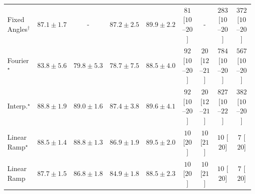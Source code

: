 \begin{tabular}{l|cccc|cccc|}
Fixed Angles$^\dagger$ & {\cellcolor[HTML]{034E7B}} \color[HTML]{F1F1F1} $87.1\pm 1.7$ & {\cellcolor[HTML]{000000}} \color[HTML]{F1F1F1} {\cellcolor{white}} \color{black} - & {\cellcolor[HTML]{034E7B}} \color[HTML]{F1F1F1} $87.2\pm 2.5$ & {\cellcolor[HTML]{034165}} \color[HTML]{F1F1F1} $89.9\pm 2.2$ & {\cellcolor[HTML]{FEE6E3}} \color[HTML]{000000} $81$ [$10$--$20$] & {\cellcolor[HTML]{000000}} \color[HTML]{F1F1F1} {\cellcolor{white}} \color{black} - & {\cellcolor[HTML]{FBAAB8}} \color[HTML]{000000} $283$ [$10$--$20$] & {\cellcolor[HTML]{F881AA}} \color[HTML]{F1F1F1} $372$ [$10$--$20$] \\
Fourier$^\star$ & {\cellcolor[HTML]{045E93}} \color[HTML]{F1F1F1} $83.8\pm 5.6$ & {\cellcolor[HTML]{056BA9}} \color[HTML]{F1F1F1} $79.8\pm 5.3$ & {\cellcolor[HTML]{056FAE}} \color[HTML]{F1F1F1} $78.7\pm 7.5$ & {\cellcolor[HTML]{034871}} \color[HTML]{F1F1F1} $88.5\pm 4.0$ & {\cellcolor[HTML]{FDE4E1}} \color[HTML]{000000} $92$ [$10$--$20$] & {\cellcolor[HTML]{FFF4F0}} \color[HTML]{000000} $20$ [$12$--$21$] & {\cellcolor[HTML]{5D006F}} \color[HTML]{F1F1F1} $784$ [$10$--$20$] & {\cellcolor[HTML]{C71D8C}} \color[HTML]{F1F1F1} $567$ [$10$--$20$] \\
Interp.$^\star$ & {\cellcolor[HTML]{03466E}} \color[HTML]{F1F1F1} $88.8\pm 1.9$ & {\cellcolor[HTML]{03456C}} \color[HTML]{F1F1F1} $89.0\pm 1.6$ & {\cellcolor[HTML]{034D79}} \color[HTML]{F1F1F1} $87.4\pm 3.8$ & {\cellcolor[HTML]{034267}} \color[HTML]{F1F1F1} $89.6\pm 4.1$ & {\cellcolor[HTML]{FDE4E1}} \color[HTML]{000000} $92$ [$10$--$20$] & {\cellcolor[HTML]{FFF4F0}} \color[HTML]{000000} $20$ [$12$--$21$] & {\cellcolor[HTML]{49006A}} \color[HTML]{F1F1F1} $827$ [$10$--$22$] & {\cellcolor[HTML]{F87AA8}} \color[HTML]{F1F1F1} $382$ [$10$--$20$] \\
Linear Ramp$^\star$ & {\cellcolor[HTML]{034871}} \color[HTML]{F1F1F1} $88.5\pm 1.4$ & {\cellcolor[HTML]{03466E}} \color[HTML]{F1F1F1} $88.8\pm 1.3$ & {\cellcolor[HTML]{034F7D}} \color[HTML]{F1F1F1} $86.9\pm 1.9$ & {\cellcolor[HTML]{034369}} \color[HTML]{F1F1F1} $89.5\pm 2.0$ & {\cellcolor[HTML]{FFF7F3}} \color[HTML]{000000} $10$ [$20$] & {\cellcolor[HTML]{FFF7F3}} \color[HTML]{000000} $10$ [$21$] & {\cellcolor[HTML]{FFF7F3}} \color[HTML]{000000} $10$ [$20$] & {\cellcolor[HTML]{FFF7F3}} \color[HTML]{000000} $7$ [$20$] \\
Linear Ramp & {\cellcolor[HTML]{034B76}} \color[HTML]{F1F1F1} $87.7\pm 1.5$ & {\cellcolor[HTML]{03517E}} \color[HTML]{F1F1F1} $86.8\pm 1.8$ & {\cellcolor[HTML]{045A8D}} \color[HTML]{F1F1F1} $84.9\pm 1.8$ & {\cellcolor[HTML]{034871}} \color[HTML]{F1F1F1} $88.5\pm 2.3$ & {\cellcolor[HTML]{FFF7F3}} \color[HTML]{000000} $10$ [$20$] & {\cellcolor[HTML]{FFF7F3}} \color[HTML]{000000} $10$ [$21$] & {\cellcolor[HTML]{FFF7F3}} \color[HTML]{000000} $10$ [$20$] & {\cellcolor[HTML]{FFF7F3}} \color[HTML]{000000} $7$ [$20$] \\

\end{tabular}

